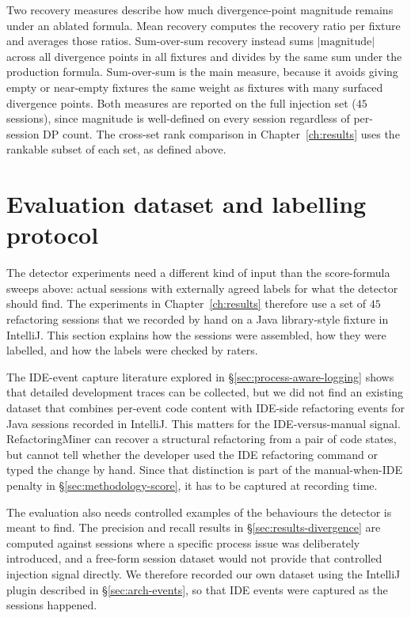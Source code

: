 Two recovery measures describe how much divergence-point magnitude remains under an ablated formula. Mean recovery computes the recovery ratio per fixture and averages those ratios. Sum-over-sum recovery instead sums $\lvert\mathrm{magnitude}\rvert$ across all divergence points in all fixtures and divides by the same sum under the production formula. Sum-over-sum is the main measure, because it avoids giving empty or near-empty fixtures the same weight as fixtures with many surfaced divergence points. Both measures are reported on the full injection set ($45$ sessions), since magnitude is well-defined on every session regardless of per-session DP count. The cross-set rank comparison in Chapter~\ref{ch:results} uses the rankable subset of each set, as defined above.

\section{Evaluation dataset and labelling protocol}
\label{sec:methodology-rater}

The detector experiments need a different kind of input than the score-formula sweeps above: actual sessions with externally agreed labels for what the detector should find. The experiments in Chapter~\ref{ch:results} therefore use a set of $45$ refactoring sessions that we recorded by hand on a Java library-style fixture in IntelliJ. This section explains how the sessions were assembled, how they were labelled, and how the labels were checked by raters.

The IDE-event capture literature explored in \S\ref{sec:process-aware-logging} shows that detailed development traces can be collected, but we did not find an existing dataset that combines per-event code content with IDE-side refactoring events for Java sessions recorded in IntelliJ. This matters for the IDE-versus-manual signal. RefactoringMiner can recover a structural refactoring from a pair of code states, but cannot tell whether the developer used the IDE refactoring command or typed the change by hand. Since that distinction is part of the manual-when-IDE penalty in \S\ref{sec:methodology-score}, it has to be captured at recording time.

The evaluation also needs controlled examples of the behaviours the detector is meant to find. The precision and recall results in \S\ref{sec:results-divergence} are computed against sessions where a specific process issue was deliberately introduced, and a free-form session dataset would not provide that controlled injection signal directly. We therefore recorded our own dataset using the IntelliJ plugin described in \S\ref{sec:arch-events}, so that IDE events were captured as the sessions happened.

